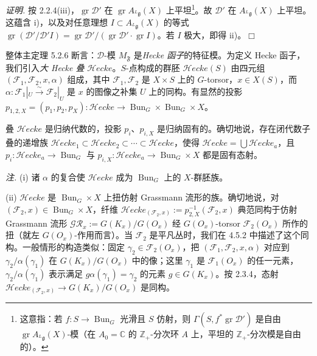 \emph{证明.} 按 2.2.4(iii)，$\operatorname{gr}\mathcal{D}'$ 在 $\operatorname{gr}A_{{}^{L}\mathfrak{g}}(X)$ 上平坦\footnote{这意指：若 $f:S\to\operatorname{Bun}_G$ 光滑且 $S$ 仿射，则 $\Gamma(S,f^*\operatorname{gr}\mathcal{D}')$ 是自由 $\operatorname{gr}A_{{}^{L}\mathfrak{g}}(X)$-模（在 $A_0=\mathbb{C}$ 的 $\mathbb{Z}_+$-分次环 $A$ 上，平坦的 $\mathbb{Z}_+$-分次模是自由的）。}。故 $\mathcal{D}'$ 在 $A_{{}^{L}\mathfrak{g}}(X)$ 上平坦。这蕴含 i)，以及对任意理想 $I\subset A_{{}^{L}\mathfrak{g}}(X)$ 的等式 $\operatorname{gr}(\mathcal{D}'/\mathcal{D}'I)=\operatorname{gr}\mathcal{D}'/(\operatorname{gr}\mathcal{D}'\cdot\operatorname{gr}I)$。若 $I$ 极大，即得 ii)。\hfill$\Box$



 整体主定理 5.2.6 断言：$\mathcal{D}$-模 $M_{\mathfrak{F}}$ 是\emph{Hecke 函子}的特征模。为定义 Hecke 函子，我们引入\emph{大 Hecke 叠} $\mathcal{H}ecke$。$S$-点构成的群胚 $\mathcal{H}ecke(S)$ 由四元组 $(\mathcal{F}_1,\mathcal{F}_2,x,\alpha)$ 组成，其中 $\mathcal{F}_1,\mathcal{F}_2$ 是 $X\times S$ 上的 $G$-torsor，$x\in X(S)$，而 $\alpha:\mathcal{F}_1|_U\xrightarrow{\sim}\mathcal{F}_2|_U$ 是 $x$ 的图像之补集 $U$ 上的同构。有显然的投影 $p_{1,2,X}=(p_1,p_2,p_X):\mathcal{H}ecke\to\operatorname{Bun}_G\times\operatorname{Bun}_G\times X$。

叠 $\mathcal{H}ecke$ 是归纳代数的，投影 $p_i$、$p_{i,X}$ 是归纳固有的。确切地说，存在闭代数子叠的递增族 $\mathcal{H}ecke_1\subset\mathcal{H}ecke_2\subset\cdots\subset\mathcal{H}ecke$，使得 $\mathcal{H}ecke=\bigcup\mathcal{H}ecke_a$，且 $p_i:\mathcal{H}ecke_a\to\operatorname{Bun}_G$ 与 $p_{i,X}:\mathcal{H}ecke_a\to\operatorname{Bun}_G\times X$ 都是固有态射。

 \emph{注.} (i) 诸 $\alpha$ 的复合使 $\mathcal{H}ecke$ 成为 $\operatorname{Bun}_G$ 上的 $X$-群胚族。

(ii) $\mathcal{H}ecke$ 是 $\operatorname{Bun}_G\times X$ 上扭仿射 Grassmann 流形的族。确切地说，对 $(\mathcal{F}_2,x)\in\operatorname{Bun}_G\times X$，纤维 $\mathcal{H}ecke_{(\mathcal{F}_2,x)}:=p_{2,X}^{-1}(\mathcal{F}_2,x)$ 典范同构于仿射 Grassmann 流形 $\mathcal{GR}_x:=G(K_x)/G(O_x)$ 经 $G(O_x)$-torsor $\mathcal{F}_2(O_x)$ 所作的扭（就左 $G(O_x)$-作用而言）。当 $\mathcal{F}_2$ 是平凡丛时，我们在 4.5.2 中描述了这个同构。一般情形的构造类似：固定 $\gamma_2\in\mathcal{F}_2(O_x)$，把 $(\mathcal{F}_1,\mathcal{F}_2,x,\alpha)$ 对应到 $\gamma_2/\alpha(\gamma_1)$ 在 $G(K_x)/G(O_x)$ 中的像；这里 $\gamma_1$ 是 $\mathcal{F}_1(O_x)$ 的任一元素，$\gamma_2/\alpha(\gamma_1)$ 表示满足 $g\alpha(\gamma_1)=\gamma_2$ 的元素 $g\in G(K_x)$。按 2.3.4，态射 $\mathcal{H}ecke_{(\mathcal{F}_2,x)}\to G(K_x)/G(O_x)$ 是同构。

